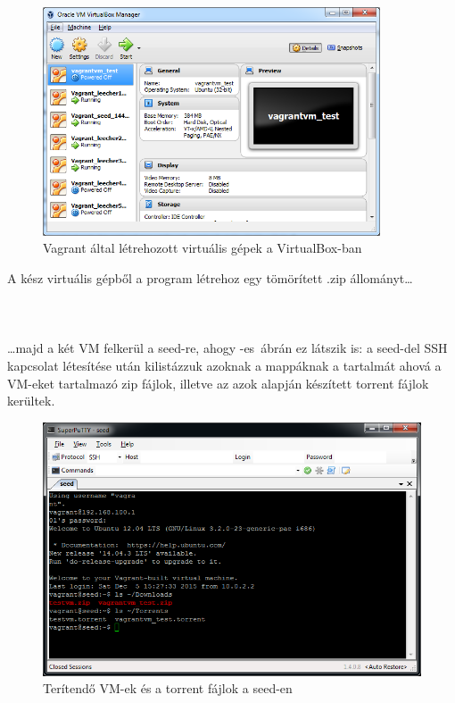 \begin{figure}[ht]
\centering
\includegraphics[width=100mm, keepaspectratio]{figures/test_vbox.png}
\caption{Vagrant által létrehozott virtuális gépek a VirtualBox-ban}
\label{fig:vboxcap}
\end{figure}
A kész virtuális gépből a program létrehoz egy tömörített .zip állományt\ldots\\\\
\\\\
\ldots majd a két VM felkerül a seed-re, ahogy -es~ábrán ez látszik is:  a seed-del SSH kapcsolat létesítése után kilistázzuk azoknak a mappáknak a tartalmát ahová a VM-eket tartalmazó zip fájlok, illetve az azok alapján készített torrent fájlok kerültek.

\begin{figure}[ht]
\centering
\includegraphics[width=120mm, keepaspectratio]{figures/test_seed_files.png}
\caption{Terítendő VM-ek és a torrent fájlok a seed-en}
\label{fig:seed_files}
\end{figure}


